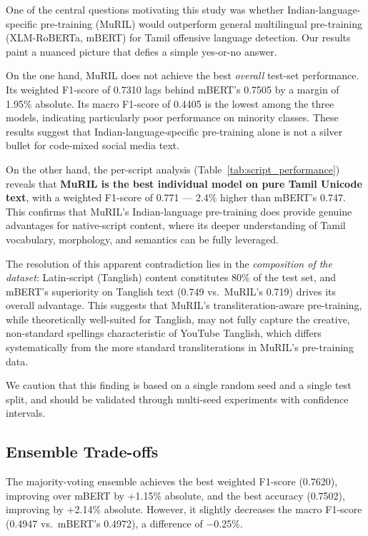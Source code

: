 \documentclass[12pt, a4paper]{article}
\begin{document}
One of the central questions motivating this study was whether Indian-language-specific pre-training (MuRIL) would outperform general multilingual pre-training (XLM-RoBERTa, mBERT) for Tamil offensive language detection. Our results paint a nuanced picture that defies a simple yes-or-no answer.

On the one hand, MuRIL does not achieve the best \textit{overall} test-set performance. Its weighted F1-score of 0.7310 lags behind mBERT's 0.7505 by a margin of 1.95\% absolute. Its macro F1-score of 0.4405 is the lowest among the three models, indicating particularly poor performance on minority classes. These results suggest that Indian-language-specific pre-training alone is not a silver bullet for code-mixed social media text.

On the other hand, the per-script analysis (Table~\ref{tab:script_performance}) reveals that \textbf{MuRIL is the best individual model on pure Tamil Unicode text}, with a weighted F1-score of 0.771 --- 2.4\% higher than mBERT's 0.747. This confirms that MuRIL's Indian-language pre-training does provide genuine advantages for native-script content, where its deeper understanding of Tamil vocabulary, morphology, and semantics can be fully leveraged.

The resolution of this apparent contradiction lies in the \textit{composition of the dataset}: Latin-script (Tanglish) content constitutes 80\% of the test set, and mBERT's superiority on Tanglish text (0.749 vs.\ MuRIL's 0.719) drives its overall advantage. This suggests that MuRIL's transliteration-aware pre-training, while theoretically well-suited for Tanglish, may not fully capture the creative, non-standard spellings characteristic of YouTube Tanglish, which differs systematically from the more standard transliterations in MuRIL's pre-training data.

We caution that this finding is based on a single random seed and a single test split, and should be validated through multi-seed experiments with confidence intervals.

\subsection{Ensemble Trade-offs}

The majority-voting ensemble achieves the best weighted F1-score (0.7620), improving over mBERT by +1.15\% absolute, and the best accuracy (0.7502), improving by +2.14\% absolute. However, it slightly decreases the macro F1-score (0.4947 vs.\ mBERT's 0.4972), a difference of $-$0.25\%.
\end{document}
